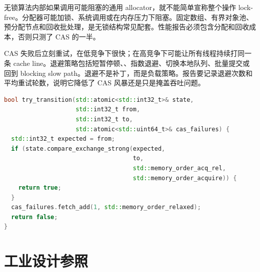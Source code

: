 无锁算法内部如果调用可能阻塞的通用 allocator，就不能简单宣称整个操作 lock-free。分配器可能加锁、系统调用或在内存压力下阻塞。固定数组、有界对象池、预分配节点和回收批处理，是无锁结构常见配套。性能报告必须包含分配和回收成本，否则只测了 CAS 的一半。

CAS 失败后立刻重试，在低竞争下很快；在高竞争下可能让所有线程持续打同一条 cache line。退避策略包括短暂停顿、、指数退避、切换本地队列、批量提交或回到 blocking slow path。退避不是补丁，而是负载策略。报告要记录退避次数和平均重试轮数，说明它降低了 CAS 风暴还是只是掩盖吞吐问题。

\begin{lstlisting}[language=C++,caption={CAS 失败计数和退避让竞争可观察}]
bool try_transition(std::atomic<std::int32_t>& state,
                    std::int32_t from,
                    std::int32_t to,
                    std::atomic<std::uint64_t>& cas_failures) {
  std::int32_t expected = from;
  if (state.compare_exchange_strong(expected,
                                    to,
                                    std::memory_order_acq_rel,
                                    std::memory_order_acquire)) {
    return true;
  }
  cas_failures.fetch_add(1, std::memory_order_relaxed);
  return false;
}
\end{lstlisting}

\section{工业设计参照}

